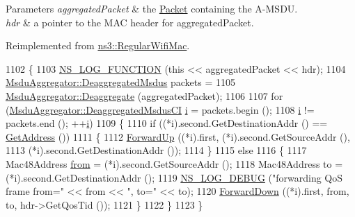 \begin{DoxyParams}{Parameters}
{\em aggregated\+Packet} & the \hyperlink{classns3_1_1Packet}{Packet} containing the A-\/\+M\+S\+DU. \\
\hline
{\em hdr} & a pointer to the M\+AC header for {\ttfamily aggregated\+Packet}. \\
\hline
\end{DoxyParams}


Reimplemented from \hyperlink{classns3_1_1RegularWifiMac_a21621ca70e5d272de72d0609eb43cf15}{ns3\+::\+Regular\+Wifi\+Mac}.


\begin{DoxyCode}
1102 \{
1103   \hyperlink{log-macros-disabled_8h_a90b90d5bad1f39cb1b64923ea94c0761}{NS\_LOG\_FUNCTION} (\textcolor{keyword}{this} << aggregatedPacket << hdr);
1104   \hyperlink{classns3_1_1MsduAggregator_a9ca3d84483249fae3dffc35bcc98bb11}{MsduAggregator::DeaggregatedMsdus} packets =
1105     \hyperlink{classns3_1_1MsduAggregator_a5fbab40dc4a2b4b8ff94508ca7c988fc}{MsduAggregator::Deaggregate} (aggregatedPacket);
1106 
1107   \textcolor{keywordflow}{for} (\hyperlink{classns3_1_1MsduAggregator_a6cc0e0e5681fa47009e6ff74d15f1656}{MsduAggregator::DeaggregatedMsdusCI} \hyperlink{bernuolliDistribution_8m_a6f6ccfcf58b31cb6412107d9d5281426}{i} = packets.begin ();
1108        \hyperlink{bernuolliDistribution_8m_a6f6ccfcf58b31cb6412107d9d5281426}{i} != packets.end (); ++\hyperlink{bernuolliDistribution_8m_a6f6ccfcf58b31cb6412107d9d5281426}{i})
1109     \{
1110       \textcolor{keywordflow}{if} ((*i).second.GetDestinationAddr () == \hyperlink{classns3_1_1RegularWifiMac_aea719a7d05fbc664c50479fc900777b7}{GetAddress} ())
1111         \{
1112           \hyperlink{classns3_1_1RegularWifiMac_a34df292af97e69fefda8303cdb323d1d}{ForwardUp} ((*i).first, (*i).second.GetSourceAddr (),
1113                      (*i).second.GetDestinationAddr ());
1114         \}
1115       \textcolor{keywordflow}{else}
1116         \{
1117           Mac48Address \hyperlink{lte__amc_8m_a1b4c81ff74eb1a626b5ade44c81004b3}{from} = (*i).second.GetSourceAddr ();
1118           Mac48Address to = (*i).second.GetDestinationAddr ();
1119           \hyperlink{group__logging_ga413f1886406d49f59a6a0a89b77b4d0a}{NS\_LOG\_DEBUG} (\textcolor{stringliteral}{"forwarding QoS frame from="} << from << \textcolor{stringliteral}{", to="} << to);
1120           \hyperlink{classns3_1_1ApWifiMac_a407bd4754f3f401eb6c5b4a4fe622250}{ForwardDown} ((*i).first, from, to, hdr->GetQosTid ());
1121         \}
1122     \}
1123 \}
\end{DoxyCode}


